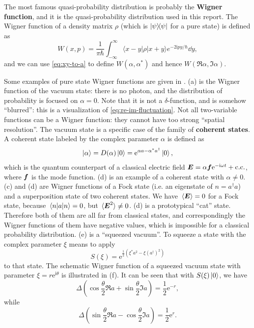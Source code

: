 \documentclass[hyperref, a4paper]{article}
\newcommand*{\ii}{\mathrm{i}}
\newcommand*{\ee}{\mathrm{e}}
\newcommand*{\concept}[1]{{\textbf{#1}}}
\begin{document}
The most famous quasi-probability distribution is probably the \concept{Wigner function},
and it is the quasi-probability distribution used in this report.
The Wigner function of a density matrix $\rho$ (which is $\dyad{\psi}$ for a pure state) 
is defined as \cite{scully1999quantum}
\begin{equation}
    W(x, p)=\frac{1}{\pi \hbar} \int_{-\infty}^{\infty}\langle x-y|{\rho}| x+y\rangle e^{-2 \ii p y / \hbar} \dd y,
\end{equation}
and we can use \eqref{eq:xy-to-a} to define $W(\alpha, \alpha^*)$ and hence $W(\Re \alpha, \Im \alpha)$.

Some examples of pure state Wigner functions are given in .
(a) is the Wigner function of the vacuum state:
there is no photon, 
and the distribution of probability is focused on $\alpha = 0$.
Note that it is not a $\delta$-function,
and is somehow ``blurred'':
this is a visualization of \eqref{eq:re-im-fluctuation}.
Not all two-variable functions can be a Wigner function:
they cannot have too strong ``spatial resolution''.
The vacuum state is a specific case of the family of \concept{coherent states}.
A coherent state labeled by the complex parameter $\alpha$ is defined as 
\begin{equation}
    \ket{\alpha} = D(\alpha) \ket{0} = \ee^{\alpha a - \alpha^* a^\dagger} \ket{0},
\end{equation}
which is the quantum counterpart of a classical electric field $\vb*{E} = \alpha \vb*{f} \ee^{- \ii \omega t} + \text{c.c.}$,
where $\vb*{f}$ is the mode function.
(d) is an example of a coherent state with $\alpha \neq 0$.
(c) and (d) 
are Wigner functions of a Fock state (i.e. an eigenstate of $n = a^\dagger a$)
and a superposition state of two coherent states.
We have $\expval*{\vb*{E}} = 0$ for a Fock state,
because $\expval*{a}{n} = 0$,
but $\expval*{\vb*{E}^2} \neq 0$.
(d) is a prototypical ``cat'' state.
Therefore both of them are all far from classical states,
and correspondingly the Wigner functions of them have negative values,
which is impossible for a classical probability distribution.
(e) is a ``squeezed vacuum''.
To squeeze a state with the complex parameter $\xi$ means to apply 
\begin{equation}
    S(\xi) = \ee^{\frac{1}{2} (\xi^* a^2 - \xi (a^\dagger)^2)}
\end{equation}
to that state.
The schematic Wigner function of a squeezed vacuum state 
with parameter $\xi = r \ee^{\ii \theta}$
is illustrated in (f).
It can be seen that with $S(\xi) \ket{0}$, 
we have \cite{scully1999quantum}
\begin{equation}
    \Delta \left( \cos \frac{\theta}{2} \Re a  + \sin \frac{\theta}{2} \Im a \right)  = \frac{1}{2} \ee^{-r},
    \label{eq:min-op-squeeze}
\end{equation} 
while 
\begin{equation}
    \Delta \left( \sin \frac{\theta}{2} \Re a - \cos \frac{\theta}{2} \Im a \right) = \frac{1}{2} \ee^{r}.
\end{equation}
\end{document}
